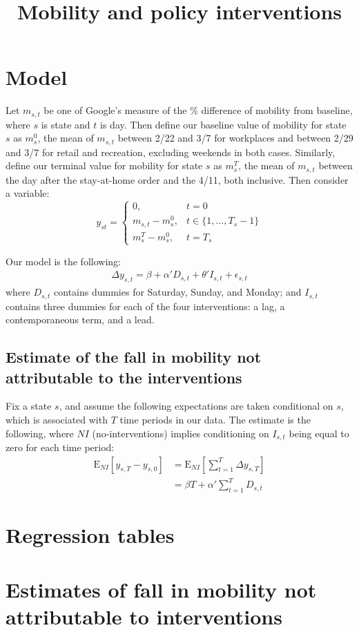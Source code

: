\documentclass{article}
\title{Mobility and policy interventions}
\author{}
\date{}
\begin{document}
\maketitle

\section{Model}
Let $m_{s,t}$ be one of Google's measure of the \% difference of mobility from baseline, where $s$ is state and $t$ is day. Then define our baseline value of mobility for state $s$ as $m_s^0$, the mean of $m_{s,t}$ between 2/22 and 3/7 for workplaces and between 2/29 and 3/7 for retail and recreation, excluding weekends in both cases. Similarly, define our terminal value for mobility for state $s$ as
$m_s^T$, the mean of $m_{s,t}$ between the day after the stay-at-home order and the 4/11, both inclusive.
Then consider a variable:
$$
y_{st} = \begin{cases}
0, &  t = 0 \\
m_{s,t} - m_s^0, & t \in \{1, \ldots, T_s-1\} \\
m_s^T - m_s^0, & t = T_s
\end{cases}
$$

Our model is the following:
\begin{align*}
\Delta y_{s,t} = \beta + \alpha' D_{s,t} + \theta' I_{s,t} + \epsilon_{s,t}
\end{align*}
where $D_{s,t}$ contains dummies for Saturday, Sunday, and Monday; and $I_{s,t}$ contains three dummies for each of the four interventions: a lag, a contemporaneous term, and a lead.

\subsection{Estimate of the fall in mobility not attributable to the interventions}
Fix a state $s$, and assume the following expectations are taken conditional on $s$, which is associated with $T$ time periods in our data. The estimate is the following, where $NI$ (no-interventions) implies conditioning on $I_{s,t}$ being equal to zero for each time period:
\begin{align*}
\text{E}_{NI}\left[y_{s,T} - y_{s,0}\right] &=
\text{E}_{NI}\left[\sum_{t=1}^T \Delta y_{s,T}\right] \\
&= \beta T + \alpha' \sum_{t=1}^T D_{s,t}
\end{align*}

\section{Regression tables}


\section{Estimates of fall in mobility not attributable to interventions}

\end{document}
